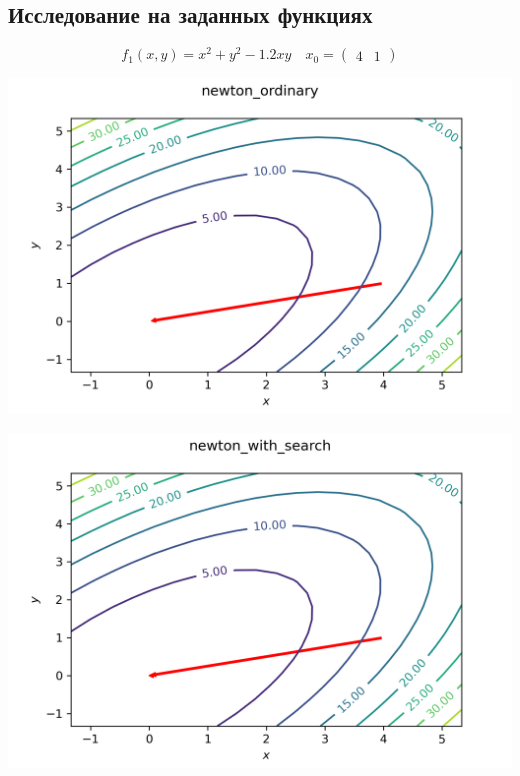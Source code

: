 \documentclass[english]{article}
\begin{document}
\subsection{Исследование на заданных функциях}
\[ f_1(x, y) = x^2 + y^2  - 1.2xy \quad x_0 = \begin{pmatrix}
  4 & 1
\end{pmatrix}\]
\begin{center}
  \includegraphics[scale=0.7]{plots/contours_newton_ordinary_4.png}
\end{center}
\begin{center}
  \includegraphics[scale=0.7]{plots/contours_newton_with_search_4.png}
\end{center}
\end{document}

